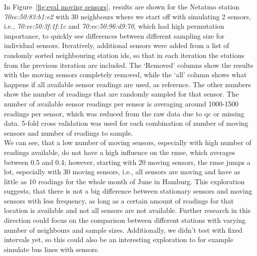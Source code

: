 In Figure~\ref{fig:eval moving sensors}, results are shown for the Netatmo station \textit{70ee:50:83:b1:e2} with 30 neighbours where we start off with simulating 2 sensors, i.e., \textit{70:ee:50:3f:1f:1c} and \textit{70:ee:50:96:d9:70}, which had high permutation importance, to quickly see differences between different sampling size for individual sensors. Iteratively, additional sensors were added from a list of randomly sorted neighbouring station ids, so that in each iteration the stations from the previous iteration are included. The `Removed' columns show the results with the moving sensors completely removed, while the `all' column shows what happens if all available sensor readings are used, as reference. The other numbers show the number of readings that are randomly sampled for that sensor. The number of available sensor readings per sensor is averaging around 1000-1500 readings per sensor, which was reduced from the raw data due to \gls{qc} or missing data. 5-fold cross validation was used for each combination of number of moving sensors and number of readings to sample.\\
We can see, that a low number of moving sensors, especially with high number of readings available, do not have a high influence on the \gls{rmse}, which averages between 0.5 and 0.4; however, starting with 20 moving sensors, the \gls{rmse} jumps a lot, especially with 30 moving sensors, i.e., all sensors are moving and have as little as 10 readings for the whole month of June in Hamburg. This exploration suggests, that there is not a big difference between stationary sensors and moving sensors with less frequency, as long as a certain amount of readings for that location is available and not all sensors are not available. Further research in this direction could focus on the comparison between different stations with varying number of neighbours and sample sizes. Additionally, we didn't test with fixed intervals yet, so this could also be an interesting exploration to for example simulate bus lines with sensors.




